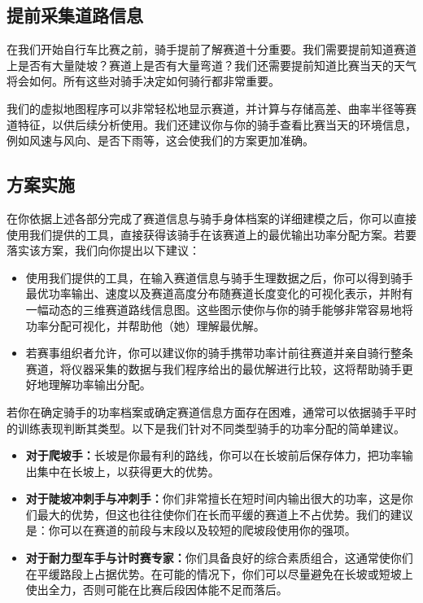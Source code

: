 \documentclass[11pt,a4paper]{ctexart}
\begin{document}
\subsection{提前采集道路信息}

在我们开始自行车比赛之前，骑手提前了解赛道十分重要。我们需要提前知道赛道上是否有大量陡坡？赛道上是否有大量弯道？我们还需要提前知道比赛当天的天气将会如何。所有这些对骑手决定如何骑行都非常重要。

我们的虚拟地图程序可以非常轻松地显示赛道，并计算与存储高差、曲率半径等赛道特征，以供后续分析使用。我们还建议你与你的骑手查看比赛当天的环境信息，例如风速与风向、是否下雨等，这会使我们的方案更加准确。

\subsection{方案实施}

在你依据上述各部分完成了赛道信息与骑手身体档案的详细建模之后，你可以直接使用我们提供的工具，直接获得该骑手在该赛道上的最优输出功率分配方案。若要落实该方案，我们向你提出以下建议：

\begin{itemize}
\item 使用我们提供的工具，在输入赛道信息与骑手生理数据之后，你可以得到骑手最优功率输出、速度以及赛道高度分布随赛道长度变化的可视化表示，并附有一幅动态的三维赛道路线信息图。这些图示使你与你的骑手能够非常容易地将功率分配可视化，并帮助他（她）理解最优解。
\item 若赛事组织者允许，你可以建议你的骑手携带功率计前往赛道并亲自骑行整条赛道，将仪器采集的数据与我们程序给出的最优解进行比较，这将帮助骑手更好地理解功率输出分配。
\end{itemize}

若你在确定骑手的功率档案或确定赛道信息方面存在困难，通常可以依据骑手平时的训练表现判断其类型。以下是我们针对不同类型骑手的功率分配的简单建议。

\begin{itemize}
\item \textbf{对于爬坡手：}长坡是你最有利的路线，你可以在长坡前后保存体力，把功率输出集中在长坡上，以获得更大的优势。
\item \textbf{对于陡坡冲刺手与冲刺手：}你们非常擅长在短时间内输出很大的功率，这是你们最大的优势，但这也往往使你们在长而平缓的赛道上不占优势。我们的建议是：你可以在赛道的前段与末段以及较短的爬坡段使用你的强项。
\item \textbf{对于耐力型车手与计时赛专家：}你们具备良好的综合素质组合，这通常使你们在平缓路段上占据优势。在可能的情况下，你们可以尽量避免在长坡或短坡上使出全力，否则可能在比赛后段因体能不足而落后。
\end{itemize}
\end{document}
